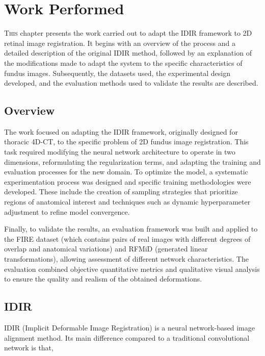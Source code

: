 \chapter{Work Performed}
\label{chap:Traballo Realizado}

\lettrine{T}{his} chapter presents the work carried out to adapt the IDIR framework to 2D retinal image registration. It begins with an overview of the process and a detailed description of the original IDIR method, followed by an explanation of the modifications made to adapt the system to the specific characteristics of fundus images. Subsequently, the datasets used, the experimental design developed, and the evaluation methods used to validate the results are described.

\section{Overview}
\label{sec:VistaXeral}

The work focused on adapting the IDIR framework, originally designed for thoracic 4D-CT, to the specific problem of 2D fundus image registration. This task required modifying the neural network architecture to operate in two dimensions, reformulating the regularization terms, and adapting the training and evaluation processes for the new domain.
To optimize the model, a systematic experimentation process was designed and specific training methodologies were developed. These include the creation of sampling strategies that prioritize regions of anatomical interest and techniques such as dynamic hyperparameter adjustment to refine model convergence.

Finally, to validate the results, an evaluation framework was built and applied to the FIRE dataset (which contains pairs of real images with different degrees of overlap and anatomical variations) and RFMiD (generated linear transformations), allowing assessment of different network characteristics. The evaluation combined objective quantitative metrics and qualitative visual analysis to ensure the quality and realism of the obtained deformations.

\section{IDIR}
\label{sec:IDIR}

IDIR (Implicit Deformable Image Registration) is a neural network-based image alignment method.
Its main difference compared to a traditional convolutional network is that,

